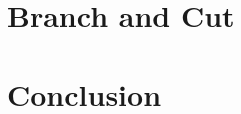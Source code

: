 \documentclass{article}
\begin{document}
\section{Branch and Cut}


\section{Conclusion}


% 
% 
\end{document}
